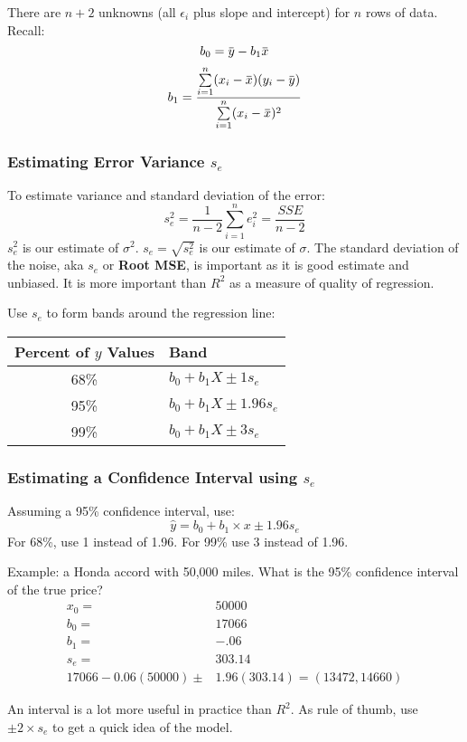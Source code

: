 \documentclass[11pt, oneside]{article}   	%
\newcommand{\overbar}[1]{\mkern 1.5mu\overline{\mkern-1.5mu#1\mkern-1.5mu}\mkern 1.5mu}
\begin{document}
There are $n+2$ unknowns (all $\epsilon_i$ plus slope and intercept) for $n$ rows of data. Recall:
\[
b_0 = \overbar{y} - b_1 \overbar{x}
\]
\[
b_1 = \frac {\sum\limits_{i=1}^n (x_i - \overbar{x})(y_i - \overbar{y})}  {\sum\limits_{i=1}^n (x_i - \overbar{x})^2}
\]

\subsubsection{Estimating Error Variance $s_e$}
To estimate variance and standard deviation of the error:
\[
s_e^2 = \frac{1}{n-2} \sum\limits_{i=1}^n e_i^2 = \frac{SSE}{n - 2}
\]
$s_e^2$ is our estimate of $\sigma^2$. $s_e = \sqrt{s_e^2}$ is our estimate of $\sigma$. The standard deviation of the noise, aka $s_e$ or \textbf{Root MSE}, is important as it is good estimate and unbiased. It is more important than $R^2$ as a measure of quality of regression.

Use $s_e$ to form bands around the regression line:

\begin{tabular}{c | l}
Percent of $y$ Values & Band \\
\hline
68\% & $b_0 + b_1 X \pm 1 s_e$ \\
95\% & $b_0 + b_1 X \pm 1.96 s_e$ \\
99\% & $b_0 + b_1 X \pm 3 s_e$ \\
\end{tabular}

\subsubsection{Estimating a Confidence Interval using $s_e$}

Assuming a 95\% confidence interval, use:
\[
\hat{y} = b_0 + b_1 \times x \pm 1.96 s_e
\]
For 68\%, use 1 instead of 1.96. For 99\% use 3 instead of 1.96.

Example: a Honda accord with 50,000 miles. What is the 95\% confidence interval of the true price?
\begin{align*}
x_0 =& 50000\\
b_0 =& 17066 \\
b_1 =& -.06 \\
s_e =& 303.14 \\
17066 - 0.06 (50000) \pm& 1.96 (303.14) = (13472,14660)
\end{align*}

An interval is a lot more useful in practice than $R^2$. As rule of thumb, use $\pm 2 \times s_e$ to get a quick idea of the model.
\end{document}

